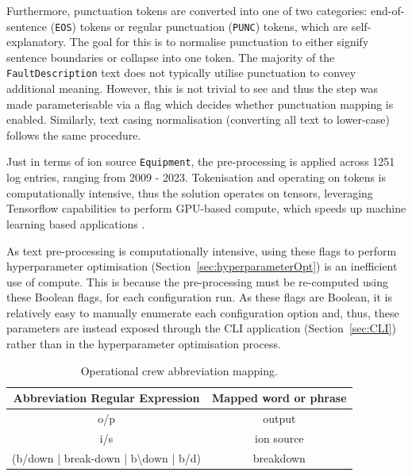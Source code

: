 \documentclass[10pt,oneside]{report}
\begin{document}
Furthermore, punctuation tokens are converted into one of two categories: end-of-sentence (\texttt{EOS}) tokens or regular punctuation (\texttt{PUNC}) tokens, which are self-explanatory. The goal for this is to normalise punctuation to either signify sentence boundaries or collapse into one token. The majority of the \texttt{FaultDescription} text does not typically utilise punctuation to convey additional meaning. However, this is not trivial to see and thus the step was made parameterisable via a flag which decides whether punctuation mapping is enabled. Similarly, text casing normalisation (converting all text to lower-case) follows the same procedure. 

Just in terms of ion source \texttt{Equipment}, the pre-processing is applied across 1251 log entries, ranging from 2009 - 2023. Tokenisation and operating on tokens is computationally intensive, thus the solution operates on tensors, leveraging Tensorflow capabilities to perform GPU-based compute, which speeds up machine learning based applications \cite{tensorflow2015whitepaper, baldini2014predicting}.

As text pre-processing is computationally intensive, using these flags to perform hyperparameter optimisation (Section~\ref{sec:hyperparameterOpt}) is an inefficient use of compute. This is because the pre-processing must be re-computed using these Boolean flags, for each configuration run. As these flags are Boolean, it is relatively easy to manually enumerate each configuration option and, thus, these parameters are instead exposed through the CLI application (Section~\ref{sec:CLI}) rather than in the hyperparameter optimisation process.


\begin{table}[htbp]
    \fontsize{8}{12}\selectfont
    \centering
    \caption{Operational crew abbreviation mapping.}
    \label{tab:abbrevCrew}
    \begin{adjustbox}{max width=\textwidth}
    \begin{tabular}{c | c}
        \toprule
        \textbf{Abbreviation Regular Expression} & \textbf{Mapped word or phrase} \\
        \midrule
        {o/p} & {output} \\
        {i/s} & {ion source} \\
        {(b/down | break-down | b\textbackslash down | b/d)} & {breakdown} \\
        \bottomrule
    \end{tabular}
    \end{adjustbox}
\end{table}
\end{document}
